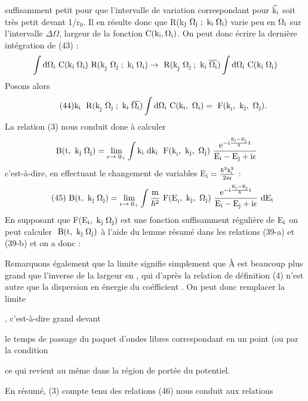 {{{suffisamment petit pour que l'intervalle de variation correspondant pour
$\vec{\text{k}}_{\text{i}}$ soit très petit devant 1/r$_0$. Il en résulte donc que R(k$_\mt{j}\ \Omega_\mt{j };\mt{ k}_\mt{i }\Omega_\mt{i})$
varie peu en $\Omega_{\text{i}}$ sur l'intervalle $\Delta\Omega$, largeur de la fonction $\text{C}(\text{k}_{\text{i}},\Omega_{\text{i}})$. On
peut donc écrire la dernière intégration de (43) :
\[
\int\text{d}\Omega_{\text{i}}\text{ C}(\text{k}_{\text{i }}\Omega_{\text{i}})
\text{ R(k}_{\text{j}}\ \Omega_{\text{j }};\text{ k}_{\text{i }}\Omega_{\text{i}})\to
\text{ R(k}_{\text{j}}\ \Omega_{\text{j }};\text{ k}_{\text{i }}\overline{\Omega_{\text{i}}})
\int\text{d}\Omega_{\text{i}}\text{ C}(\text{k}_{\text{i }}\Omega_{\text{i}})
\]
Posons alors
\[
\tag{44}\text{k}_{\text{i }}\text{ R(k}_{\text{j}}\ \Omega_{\text{j }};\text{ k}_{\text{i }}\overline{\Omega_{\text{i}}})
\int\text{d}\Omega_{\text{i}}\text{ C}(\text{k}_{\text{i}},\ \Omega_{\text{i}})=\text{ F(k}_{\text{i}},\text{ k}_{\text{j}},\ \Omega_{\text{j}}).
\]
La relation (3) nous conduit done à calculer
\[
\mt{ B(t},\mt{ k}_\mt{j }\Omega_\mt{j})=\lim_{\epsilon\to\;0_+}
\int\mt{k}_\mt{i}\mt{ dk}_\mt{i }\mt{ F(k}_\mt{i},\mt{ k}_\mt{j},\ \Omega_\mt{j})
\ \frac{\mt{e}^{-\mt{i}\frac{\mt{E}_\mt{i}-\mt{E}_\mt{j}}{\hbar}\mt{t}}}{\mt{E}_\mt{i}-\mt{E}_\mt{j}+\mt{i}\epsilon}
\]
c'est-à-dire, en effectuant le changement de variables E$_{\text{i}}=\frac{\hbar^2\text{k}_{\text{i}}^2}{2\text{m}}$ :
\[
\tag{45}\mt{ B(t},\mt{ k}_\mt{j }\Omega_\mt{j})=\lim_{\epsilon\to\;0_+}
\int\frac{\mt{m}}{\hbar^2}\mt{ F(E}_\mt{i},\mt{ k}_\mt{j},\ \Omega_\mt{j})
\ \frac{\mt{e}^{-\mt{i}\frac{\mt{E}_\mt{i}-\mt{E}_\mt{j}}{\hbar}\mt{t}}}{\mt{E}_\mt{i}-\mt{E}_\mt{j}+\mt{i}\epsilon}
\mt{ dE}_\mt{i }
\]
En supposant que F(E$_{\text{i}},\text{ k}_{\text{j }}\Omega_{\text{j}})$ est une fonction suffisamment régulière
de E$_{\text{i}}$ on peut calculer $\text{ B(t},\text{ k}_{\text{j }}\Omega_{\text{j}})$ à l'aide du lemme résumé dans les
relations (39-a) et (39-b) et on a donc :


Remarquons également que la limite  signifie simplement que À
est beaucoup plus grand que l'inverse de la largeur en ,
qui d'après la relation de définition (4) n'est autre que la dispersion en
énergie  du coéfficient . On peut donc remplacer la limite

, c'est-à-dire  grand devant

le temps de passage du paquet d'ondes libres correspondant en un point (ou
 par la condition

ce qui revient au même dans la région de portée du potentiel.

En résumé, (3) compte tenu des relations (46) nous conduit aux
relations

}}}
